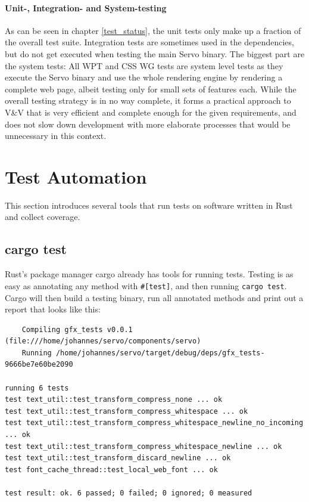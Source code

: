 \documentclass{scrartcl}
\begin{document}
\paragraph{Unit-, Integration- and System-testing}
As can be seen in chapter \ref{test_status}, the unit tests only make up a fraction of the overall test suite. Integration tests are sometimes used in the dependencies, but do not get executed when testing the main Servo binary. The biggest part are the system tests: All WPT and CSS WG tests are system level tests as they execute the Servo binary and use the whole rendering engine by rendering a complete web page, albeit testing only for small sets of features each. While the overall testing strategy is in no way complete, it forms a practical approach to V\&V that is very efficient and complete enough for the given requirements, and does not slow down development with more elaborate processes that would be unnecessary in this context.


\newpage


\section{Test Automation}

This section introduces several tools that run tests on software written in Rust and collect coverage.

\subsection{cargo test}

Rust's package manager cargo already has tools for running tests. Testing is as easy as annotating any method with \texttt{\#[test]}, and then running \texttt{cargo test}. Cargo will then build a testing binary, run all annotated methods and print out a report that looks like this:


\small {

\begin{verbatim}
    Compiling gfx_tests v0.0.1 (file:///home/johannes/servo/components/servo)
    Running /home/johannes/servo/target/debug/deps/gfx_tests-9666be7e60be2090

running 6 tests
test text_util::test_transform_compress_none ... ok
test text_util::test_transform_compress_whitespace ... ok
test text_util::test_transform_compress_whitespace_newline_no_incoming ... ok
test text_util::test_transform_compress_whitespace_newline ... ok
test text_util::test_transform_discard_newline ... ok
test font_cache_thread::test_local_web_font ... ok

test result: ok. 6 passed; 0 failed; 0 ignored; 0 measured

\end{verbatim}
}
\end{document}
